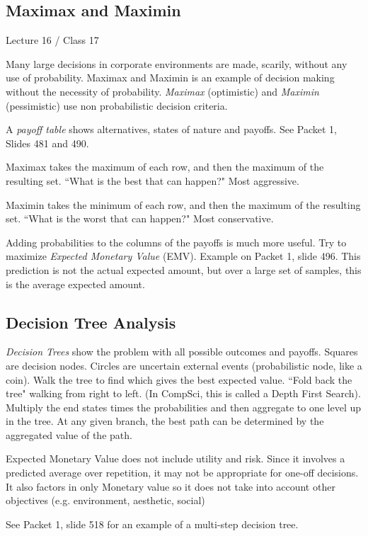 \documentclass[11pt, oneside]{article}   	%
\begin{document}
\subsection{Maximax and Maximin}
Lecture 16 / Class 17

Many large decisions in corporate environments are made, scarily, without any use of probability. Maximax and Maximin is an example of decision making without the necessity of probability. 
\textit{Maximax} (optimistic) and \textit{Maximin} (pessimistic)  use non probabilistic decision criteria. 

A \textit{payoff table} shows alternatives, states of nature and payoffs. See Packet 1, Slides 481 and 490. 

Maximax takes the maximum of each row, and then the maximum of the resulting set. ``What is the best that can happen?" Most aggressive.

Maximin takes the minimum of each row, and then the maximum of the resulting set. ``What is the worst that can happen?" Most conservative.

Adding probabilities to the columns of the payoffs is much more useful. Try to maximize \textit{Expected Monetary Value} (EMV). Example on Packet 1, slide 496. This prediction is not the actual expected amount, but over a large set of samples, this is the average expected amount. 

\subsection{Decision Tree Analysis}

\textit{Decision Trees} show the problem with all possible outcomes and payoffs. Squares are decision nodes. Circles are uncertain external events (probabilistic node, like a coin). Walk the tree to find which gives the best expected value. ``Fold back the tree" walking from right to left. (In CompSci, this is called a Depth First Search). Multiply the end states times the probabilities and then aggregate to one level up in the tree. At any given branch, the best path can be determined by the aggregated value of the path.

Expected Monetary Value does not include utility and risk. Since it involves a predicted average over repetition, it may not be appropriate for one-off decisions. It also factors in only Monetary value so it does not take into account other objectives (e.g. environment, aesthetic, social)

See Packet 1, slide 518 for an example of a multi-step decision tree.
\end{document}
